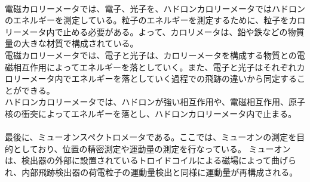 \documentclass{jreport}
\begin{document}
\\
\newpage
電磁カロリーメータでは、電子、光子を、ハドロンカロリーメータではハドロンのエネルギーを測定している。粒子のエネルギーを測定するために、粒子をカロリーメータ内で止める必要がある。よって、カロリメータは、鉛や鉄などの物質量の大きな材質で構成されている。\\
電磁カロリーメータでは、電子と光子は、カロリーメータを構成する物質との電磁相互作用によってエネルギーを落としていく。また、電子と光子はそれぞれカロリーメータ内でエネルギーを落としていく過程での飛跡の違いから同定することができる。\\
ハドロンカロリーメータでは、ハドロンが強い相互作用や、電磁相互作用、原子核の衝突によってエネルギーを落とし、ハドロンカロリーメータ内で止まる。
\\
\\
最後に、ミューオンスペクトロメータである。ここでは、ミューオンの測定を目的としており、位置の精密測定や運動量の測定を行なっている。
ミューオンは、検出器の外部に設置されているトロイドコイルによる磁場によって曲げられ、内部飛跡検出器の荷電粒子の運動量検出と同様に運動量が再構成される。
\end{document}
